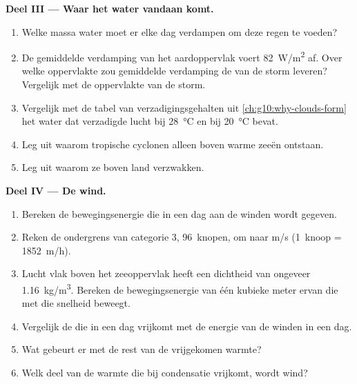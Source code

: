 \begin{problem}
\medskip
\noindent\textbf{Deel III --- Waar het water vandaan komt.}
\begin{enumerate}[resume]
  \item Welke massa water moet er elke dag verdampen om deze regen te voeden?
  \item De gemiddelde verdamping van het aardoppervlak voert \qty{82}{W/m^2} af.
        Over welke oppervlakte zou gemiddelde verdamping de  van de
        storm leveren? Vergelijk met de oppervlakte van de storm.
  \item Vergelijk met de tabel van verzadigingsgehalten uit
        \cref{ch:g10:why-clouds-form} het water dat verzadigde lucht bij
        \qty{28}{\degreeCelsius} en bij \qty{20}{\degreeCelsius} bevat.
  \item Leg uit waarom tropische cyclonen alleen boven warme zeeën ontstaan.
  \item Leg uit waarom ze boven land verzwakken.
\end{enumerate}

\medskip
\noindent\textbf{Deel IV --- De wind.}
\begin{enumerate}[resume]
  \item Bereken de bewegingsenergie die in een dag aan de winden wordt gegeven.
  \item Reken de ondergrens van categorie 3, \num{96}~knopen, om naar
        \unit{m/s} (\num{1}~knoop = \qty{1852}{m/h}).
  \item Lucht vlak boven het zeeoppervlak heeft een dichtheid van ongeveer
        \qty{1.16}{kg/m^3}. Bereken de bewegingsenergie van één kubieke meter
        ervan die met die snelheid beweegt.
  \item Vergelijk de  die in een dag vrijkomt met de energie van
        de winden in een dag.
  \item Wat gebeurt er met de rest van de vrijgekomen warmte?
  \item Welk deel van de warmte die bij condensatie vrijkomt, wordt wind?
\end{enumerate}
\end{problem}
